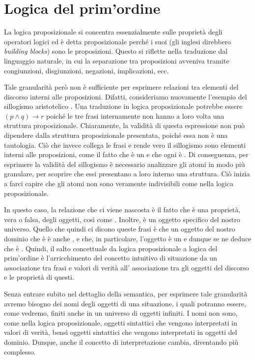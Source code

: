\chapter{Logica del prim'ordine}

La logica proposizionale si concentra essenzialmente sulle proprietà degli operatori logici ed è detta proposizionale perché i suoi  (gli inglesi direbbero \emph{building blocks}) sono le proposizioni. Questo si riflette nella traduzione dal linguaggio naturale, in cui la separazione tra proposizioni avveniva tramite congiunzioni, disgiunzioni, negazioni, implicazioni, ecc.

Tale granularità però non è sufficiente per esprimere relazioni tra elementi del discorso interni alle proposizioni. Difatti, consideriamo nuovamente l'esempio del sillogismo aristotelico . Una traduzione in logica proposizionale potrebbe essere \((p\land q)\to r\) poiché le tre frasi internamente non hanno a loro volta una struttura proposizionale. Chiaramente, la validità di questa espressione non può dipendere dalla struttura proposizionale presentata, poiché essa non è una tautologia. Ciò che invece collega le frasi e rende vero il sillogismo sono elementi interni alle proposizioni, come il fatto che  è un  e che ogni  è . Di conseguenza, per esprimere la validità del sillogismo è necessario analizzare gli atomi in modo più granulare, per scoprire che essi presentano a loro interno una struttura.
Ciò inizia a farci capire che gli atomi non sono veramente indivisibili come nella logica proposizionale. 

In questo caso, la relazione che ci viene nascosta è il fatto che  è una proprietà, vera o falsa, degli oggetti, così come . Inoltre,  è un oggetto specifico del nostro universo. Quello che quindi ci dicono queste frasi è che un oggetto del nostro dominio che è  è anche , e che, in particolare, l'oggetto  è un  e dunque se ne deduce che  è . Quindi, il salto concettuale da logica proposizionale a logica del prim'ordine è l'arricchimento del concetto intuitivo di situazione da un associazione tra frasi e valori di verità all' associazione tra gli oggetti del discorso e le proprietà di questi.

Senza entrare subito nel dettaglio della semantica, per esprimere tale granularità avremo bisogno dei nomi degli oggetti di una situazione, i quali potranno essere, come vedremo, finiti anche in un universo di oggetti infiniti. I nomi non sono, come nella logica proposizionale, oggetti sintattici che vengono interpretati in valori di verità, bensì oggetti sintattici che vengono interpretati in oggetti del dominio. Dunque, anche il concetto di interpretazione cambia, diventando più complesso.

